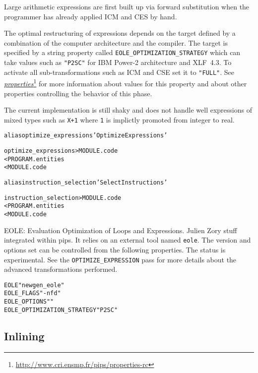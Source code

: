 \documentclass[a4paper]{report}
\newenvironment{PipsProp}{\begin{alltt}}{\end{alltt}}
\newenvironment{PipsMake}{\begin{alltt}}{\end{alltt}}
\newcommand{\LINK}[2]{\href{#2}{#1}\footnote{\url{#2}}\xspace}
\newcommand{\PROPERTIES}{\LINK{\emph{properties}}{http://www.cri.ensmp.fr/pips/properties-rc}}
\begin{document}
Large arithmetic expressions are first built up via forward substitution
when the programmer has already applied ICM and CES by hand.

The optimal restructuring of expressions depends on the target defined by
a combination of the computer architecture and the compiler. The target is
specified by a string property called \verb|EOLE_OPTIMIZATION_STRATEGY|
which can take values such as \verb|"P2SC"| for IBM Power-2 architecture
and XLF~4.3. To activate all sub-transformations such as ICM and CSE set
it to \verb|"FULL"|. See \PROPERTIES{} for more information about values
for this property and about other properties controlling the behavior of
this phase.

The current implementation is still shaky and does not handle well
expressions of mixed types such as \verb|X+1| where \verb|1| is implictly
promoted from integer to real.

\begin{PipsMake}
alias optimize_expressions 'Optimize Expressions'

optimize_expressions    > MODULE.code
        < PROGRAM.entities
        < MODULE.code

alias instruction_selection 'Select Instructions'

instruction_selection > MODULE.code
        < PROGRAM.entities
        < MODULE.code
\end{PipsMake}


EOLE: Evaluation Optimization of Loops and Expressions.
Julien Zory stuff integrated within pips. It relies on an external tool
named \texttt{eole}. The version and options set can be controlled from
the following properties. The status is experimental. See the
\texttt{OPTIMIZE\_EXPRESSION} pass for more details about the advanced
transformations performed.

\begin{PipsProp}
EOLE            "newgen_eole"
EOLE_FLAGS      "-nfd"
EOLE_OPTIONS    ""
EOLE_OPTIMIZATION_STRATEGY "P2SC"
\end{PipsProp}



\subsection{Inlining}
\label{subsection-inlining}
\end{document}
